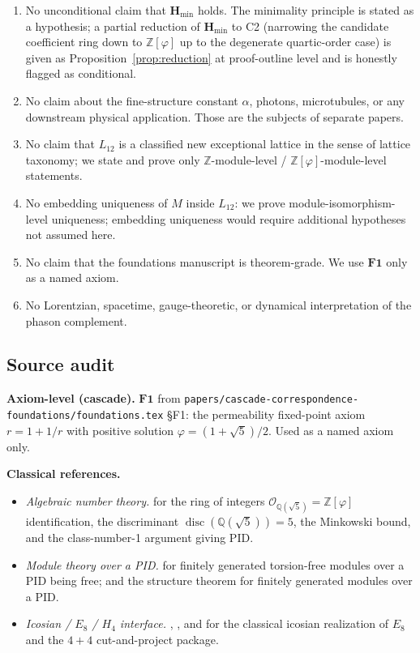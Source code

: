 \documentclass[11pt, a4paper]{amsart}
\theoremstyle{definition}
\newcommand{\Q}{\mathbb{Q}}
\newcommand{\Z}{\mathbb{Z}}
\newcommand{\disc}{\operatorname{disc}}
\newcommand{\Hmin}{\mathbf{H}_{\min}}
\newcommand{\Ophi}{\mathbb{Z}[\varphi]}
\begin{document}
\begin{enumerate}
\item No unconditional claim that $\Hmin$ holds. The minimality
  principle is stated as a hypothesis; a partial reduction of
  $\Hmin$ to C2 (narrowing the candidate coefficient ring down
  to $\Ophi$ up to the degenerate quartic-order case) is given
  as Proposition~\ref{prop:reduction} at proof-outline level and
  is honestly flagged as conditional.
\item No claim about the fine-structure constant $\alpha$,
  photons, microtubules, or any downstream physical
  application. Those are the subjects of separate papers.
\item No claim that $L_{12}$ is a classified new exceptional
  lattice in the sense of lattice taxonomy; we state and prove
  only $\Z$-module-level / $\Ophi$-module-level statements.
\item No embedding uniqueness of $M$ inside $L_{12}$: we prove
  module-isomorphism-level uniqueness; embedding uniqueness
  would require additional hypotheses not assumed here.
\item No claim that the foundations manuscript is theorem-grade.
  We use $\mathbf{F1}$ only as a named axiom.
\item No Lorentzian, spacetime, gauge-theoretic, or dynamical
  interpretation of the phason complement.
\end{enumerate}

\subsection{Source audit}

\textbf{Axiom-level (cascade).}
$\mathbf{F1}$ from
\texttt{papers/cascade-correspondence-foundations/foundations.tex}
\S F1: the permeability fixed-point axiom $r = 1 + 1/r$ with
positive solution $\varphi = (1+\sqrt{5})/2$. Used as a named
axiom only.

\textbf{Classical references.}
\begin{itemize}
\item \emph{Algebraic number theory.}
  \cite{Marcus, Neukirch} for the ring of integers
  $\mathcal{O}_{\Q(\sqrt{5})} = \Ophi$ identification, the
  discriminant $\disc(\Q(\sqrt{5})) = 5$, the Minkowski bound,
  and the class-number-1 argument giving PID.
\item \emph{Module theory over a PID.}
  \cite{AtiyahMacdonald, DummitFoote} for finitely generated
  torsion-free modules over a PID being free; and the
  structure theorem for finitely generated modules over a PID.
\item \emph{Icosian / $E_8$ / $H_4$ interface.}
  \cite[Ch.~8, Eq.~(17) and Table~8.1]{ConwaySloane},
  \cite[Thm.~4.1, Prop.~4.2]{MoodyPatera}, and
  \cite{ElserSloane} for the classical icosian realization of
  $E_8$ and the $4+4$ cut-and-project package.
\end{itemize}
\end{document}
